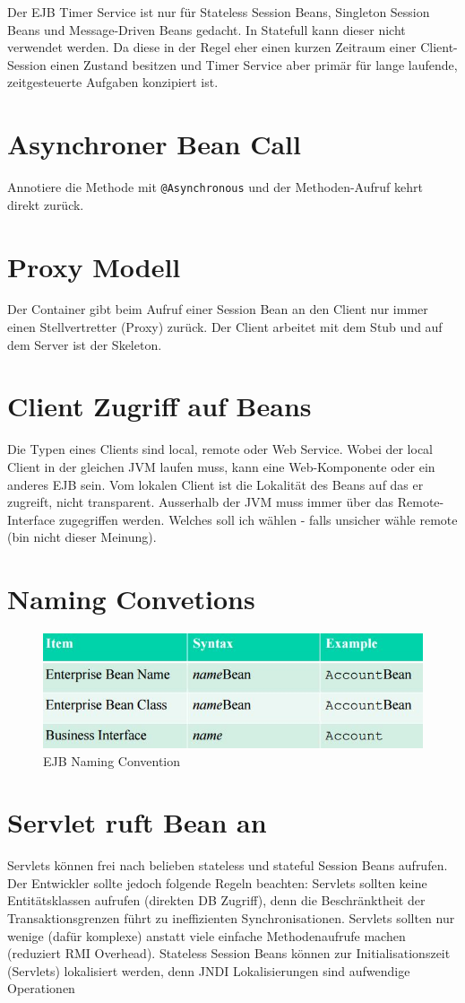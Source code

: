 Der EJB Timer Service ist nur für Stateless Session Beans, Singleton Session Beans und Message-Driven Beans gedacht. In Statefull kann dieser nicht verwendet werden. Da diese in der Regel eher einen kurzen Zeitraum einer Client-Session einen Zustand besitzen und Timer Service aber primär für lange laufende, zeitgesteuerte Aufgaben konzipiert ist.

\section{Asynchroner Bean Call}
Annotiere die Methode mit \verb|@Asynchronous| und der Methoden-Aufruf kehrt direkt zurück.

\section{Proxy Modell}
Der Container gibt beim Aufruf einer Session Bean an den Client nur immer einen Stellvertretter (Proxy) zurück. Der Client arbeitet mit dem Stub und auf dem Server ist der Skeleton.

\section{Client Zugriff auf Beans}
Die Typen eines Clients sind local, remote oder Web Service. Wobei der local Client in der gleichen JVM laufen muss, kann eine Web-Komponente oder ein anderes EJB sein. Vom lokalen Client ist die Lokalität des Beans auf das er zugreift, nicht transparent. Ausserhalb der JVM muss immer über das Remote-Interface zugegriffen werden. Welches soll ich wählen - falls unsicher wähle remote (bin nicht dieser Meinung).

\newpage
\section{Naming Convetions}
\begin{figure}[h!]
\centering
\includegraphics[width=0.7\linewidth]{fig/ejb-naming-convention}
\caption{EJB Naming Convention}
\label{fig:ejb-naming-convention}
\end{figure}

\section{Servlet ruft Bean an}
Servlets können frei nach belieben stateless und stateful Session Beans aufrufen. Der Entwickler sollte jedoch folgende Regeln beachten: Servlets sollten keine Entitätsklassen aufrufen (direkten DB Zugriff), denn die Beschränktheit der
Transaktionsgrenzen führt zu ineffizienten Synchronisationen. Servlets sollten nur wenige (dafür komplexe) anstatt viele einfache Methodenaufrufe machen (reduziert RMI Overhead). Stateless Session Beans können zur Initialisationszeit (Servlets) lokalisiert werden, denn JNDI Lokalisierungen sind aufwendige Operationen 

